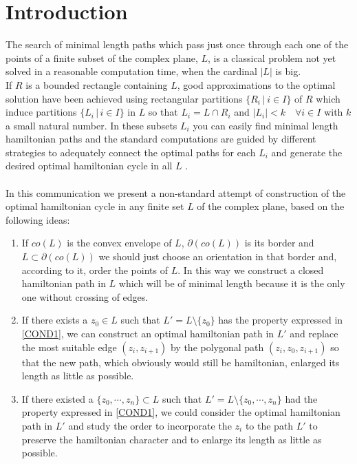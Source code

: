 \documentclass[a4paper]{article} %
\begin{document}
\section{Introduction}
The search of minimal length paths which pass just once through each one of the points of a finite subset of the complex plane, $L$, is a classical problem not yet solved in a reasonable computation time, when the cardinal $|L|$  is big.\\
If $R$ is a bounded rectangle containing $L$, good approximations to the optimal solution have been achieved using rectangular partitions $\{R_i \,|\ i\in I\}$ of $R$ which induce partitions $\{L_i\,|\, i\in I\}$ in $L$ so that $L_i=L\cap R_i$ and $|L_i|<k\quad\forall i\in I$ with $k$ a small natural number. In these subsets $L_i$ you can easily find minimal length hamiltonian paths and the standard computations are guided by different strategies to adequately connect the optimal paths for each $L_i$ and generate the desired optimal hamiltonian cycle in all $L$ \cite{H-P}.\\\\
In this communication we present a non-standard attempt of construction of the optimal hamiltonian cycle in any finite set $L$ of the complex plane, based on the following ideas:
\begin{enumerate}\label{COND1}
  \item If $co(L)$ is the convex envelope of $L$, $\partial(co(L))$ is its border and $L\subset \partial(co(L))$ we should just choose an orientation in that border and, according to it, order the points of $L$. In this way we construct a closed hamiltonian path in $L$ which will be of minimal length because it is the only one without crossing of edges.
  \item If there exists a  $z_0\in L$  such that $L'=L\setminus\{z_0\}$ has the property expressed in  \ref{COND1}, we can construct an optimal hamiltonian path in $L'$ and replace the most suitable edge $(z_i,z_{i+1})$ by the polygonal path $(z_i,z_0,z_{i+1})$ so that the new path, which obviously would still be hamiltonian, enlarged its length as little as possible.
  \item \label{COND2} If there existed a $\{z_0,\cdots,z_n\}\subset L$ such that $L'=L\setminus\{z_0,\cdots,z_n\}$ had the property expressed in  \ref{COND1}, we could consider the optimal hamiltonian path in $L'$ and study the order to incorporate the $z_i$ to the path $L'$ to preserve the hamiltonian character and to enlarge its length as little as possible.
  \end{enumerate}
\end{document}
